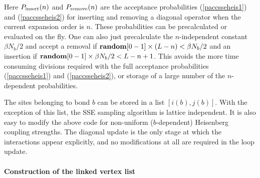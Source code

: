 \documentclass[draft,numberedheadings]{aipproc}
\begin{document}
\noindent
Here $P_{\rm insert}(n)$ and $P_{\rm remove}(n)$ are the acceptance probabilities (\ref{paccsseheis1}) and (\ref{paccsseheis2}) for inserting and removing a diagonal 
operator when the current expansion order is $n$. These probabilities can be precalculated or evaluated on the fly. One can also just precalculate the $n$-independent 
constant $\beta N_b/2$ and accept a removal if ${\bf random}[0-1]\times (L-n)<\beta N_b/2$ and an insertion if ${\bf random}[0-1]\times \beta N_b/2<L-n+1$. 
This avoids the more time consuming divisions required with the full acceptance probabilities  (\ref{paccsseheis1}) and (\ref{paccsseheis2}), or storage of 
a large number of the $n$-dependent probabilities. 

The sites belonging to bond $b$ can be stored in a list $[i(b),j(b)]$. With the exception of this list, the SSE sampling algorithm is lattice independent. 
It is also easy to modify the above code for non-uniform ($b$-dependent) Heisenberg coupling strengths. The diagonal update is the only stage at which the 
interactions appear explicitly, and no modifications at all are required in the loop update.

\paragraph{Construction of the linked vertex list}
\end{document}
